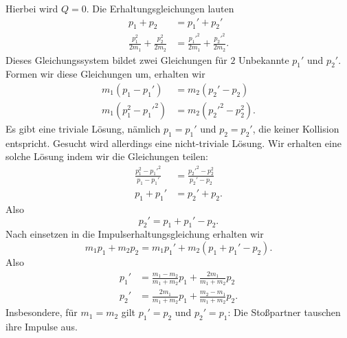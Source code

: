 \begin{beispiel}
Hierbei wird $Q=0$. Die Erhaltungsgleichungen lauten
\begin{equation}
	\begin{split}
		p_1+p_2 &= p_1'+p_2'\\
		\frac{p_1^2}{2m_1} + \frac{p_2^2}{2m_2} &= \frac{{p_1'}^2}{2m_1} + \frac{{p_2'}^2}{2m_2}.
	\end{split}
\end{equation}
Dieses Gleichungssystem bildet zwei Gleichungen für $2$ Unbekannte $p_1'$ und $p_2'$. Formen wir diese Gleichungen um, erhalten wir
\begin{equation}
	\begin{split}
		m_1(p_1-p_1') &= m_2(p_2'-p_2) \\
		m_1(p_1^2-{p_1'}^2) &= m_2({p_2'}^2-p_2^2).
	\end{split}
\end{equation}
Es gibt eine triviale Lösung, nämlich $p_1 = p_1'$ und $p_2 = p_2'$, die keiner Kollision entspricht. Gesucht wird allerdings eine nicht-triviale Lösung. Wir erhalten eine solche Lösung indem wir die Gleichungen teilen:
\begin{equation}
	\begin{split}
		\frac{p_1^2-{p_1'}^2}{p_1-p_1'} &= \frac{{p_2'}^2-p_2^2}{p_2'-p_2} \\
		p_1+p_1' &= p_2'+p_2.
	\end{split}
\end{equation}
Also
\begin{equation}
	p_2' = p_1+p_1'-p_2.
\end{equation}
Nach einsetzen in die Impulserhaltungsgleichung erhalten wir
\begin{equation}
	m_1p_1 + m_2p_2 = m_1p_1' + m_2(p_1+p_1'-p_2).
\end{equation}
Also
\begin{equation}
	\begin{split}
		p_1' &= \frac{m_1-m_2}{m_1+m_2}p_1 + \frac{2m_1}{m_1+m_2}p_2 \\
		p_2' &= \frac{2m_1}{m_1+m_2}p_1 + \frac{m_2-m_1}{m_1+m_2}p_2.
	\end{split}
\end{equation}
Insbesondere, für $m_1=m_2$ gilt $p_1'=p_2$ und $p_2'=p_1$: Die Stoßpartner tauschen ihre Impulse aus.


\end{beispiel}
